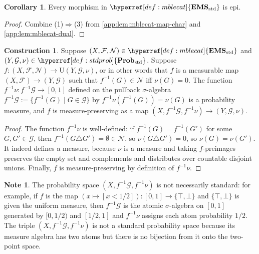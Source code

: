 \documentclass[
  sigconf,
  screen, ]{acmart}
\theoremstyle{definition}
\newtheorem{corollary}[theorem]{Corollary}
\newtheorem{construction}[theorem]{Construction}
\newtheorem{note}[theorem]{Note}
\newcommand\calF{\mathcal F}
\newcommand\calG{\mathcal G}
\newcommand\calN{\mathcal N}
\newcommand\nref[2]{\hyperref[#1]{#2}} \newcommand\checkhigh{{\huge{\color{red}\textbf{TODO: check}}}}
\newcommand\vtrue{\top}
\newcommand\vfalse{\bot}
\newcommand\texforgetmu{\mathrm{U}}
\newcommand\forgetmu{{\nref{def:forgetmu}{\texforgetmu}}}
\newcommand\pbmeas[2]{{\nref{app:cons:pbmeas}{#1}^{-1}}#2}
\newcommand\texStdProb{\mathbf{Prob}_{\rm std}}
\newcommand\StdProb{{\nref{def:stdprob}{\texStdProb}}}
\newcommand\texStdMble{\mathbf{EMS}_{\rm std}}
\newcommand\StdMble{{\nref{def:mblecat}{\texStdMble}}}
\begin{document}
\begin{corollary} \label{app:cor:stdmble-epis}
  Every morphism in $\StdMble$ is epi.
\end{corollary}
\begin{proof}
  Combine (1)$\Rightarrow$(3) from \cref{app:lem:mblecat-map-char} 
  and \cref{app:lem:mblecat-dual}.
\end{proof}

\begin{construction} \label{app:cons:pbmeas}
  Suppose $(X,\calF,\calN)\in\StdMble$
  and $(Y,\calG,\nu)\in\StdProb$.
  Suppose $f : (X,\calF,\calN)\to \forgetmu(Y,\calG,\nu)$,
  or in other words that $f$ is a measurable map $(X,\calF)\to(Y,\calG)$
  such that $f^{-1}(G)\in\calN$ iff $\nu(G) = 0$.
  The function $\pbmeas f\nu : f^{-1}\calG\to[0,1]$
  defined on the pullback $\sigma$-algebra
  $f^{-1}\calG := \{ f^{-1}(G) \mid G\in\calG\}$
  by $\pbmeas f\nu(f^{-1}(G)) = \nu(G)$
  is a probability measure,
  and $f$ is measure-preserving
  as a map $(X,f^{-1}\calG,\pbmeas f\nu)\to(Y,\calG,\nu)$.
\end{construction}
\begin{proof}
  The function $\pbmeas f\nu$ is well-defined: if $f^{-1}(G) = f^{-1}(G')$
  for some $G,G'\in\calG$, then $f^{-1}(G\triangle G') = \emptyset \in \calN$,
  so $\nu(G\triangle G') = 0$, so $\nu(G) = \nu(G')$.
  It indeed defines a measure, because $\nu$ is a measure and taking $f$-preimages
  preserves the empty set and complements
  and distributes over countable disjoint unions.
  Finally, $f$ is measure-preserving by definition of $\pbmeas f\nu$.
\end{proof}

\begin{note}
  The probability space $(X,f^{-1}\calG,\pbmeas f\nu)$
  is not necessarily standard:
  for example, if $f$ is the map $(x\mapsto [x<1/2]) : [0,1]\to \{\vtrue,\vfalse\}$
  and $\{\vtrue,\vfalse\}$ is given the uniform measure,
  then $f^{-1}\calG$ is the atomic $\sigma$-algebra
  on $[0,1]$ generated by $[0,1/2)$
  and $[1/2,1]$ and $\pbmeas f\nu$ assigns each atom probability $1/2$.
  The triple $(X,f^{-1}\calG,\pbmeas f\nu)$ is not a standard probability space
  because its measure algebra has two atoms but there is no
  bijection from it onto the two-point space.
\end{note}
\end{document}
